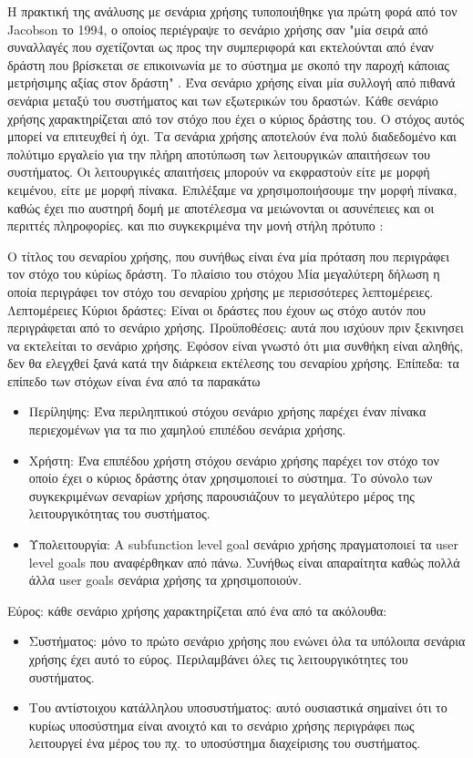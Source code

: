Η πρακτική της ανάλυσης με σενάρια χρήσης τυποποιήθηκε για πρώτη φορά από τον Jacobson το 1994, ο οποίος περιέγραψε το σενάριο χρήσης σαν "μία σειρά από συναλλαγές που σχετίζονται ως προς την συμπεριφορά και εκτελούνται από έναν δράστη που βρίσκεται σε επικοινωνία με το σύστημα με σκοπό την παροχή κάποιας μετρήσιμης αξίας στον δράστη" \cite{Jacobson} . Ένα σενάριο χρήσης είναι μία συλλογή από πιθανά σενάρια μεταξύ του συστήματος και των εξωτερικών του δραστών. Κάθε σενάριο χρήσης χαρακτηρίζεται από τον στόχο που έχει ο κύριος δράστης του. Ο στόχος αυτός μπορεί να επιτευχθεί ή όχι. Τα σενάρια χρήσης αποτελούν ένα πολύ διαδεδομένο και πολύτιμο εργαλείο για την πλήρη αποτύπωση των λειτουργικών απαιτήσεων του συστήματος. Οι λειτουργικές απαιτήσεις μπορούν να εκφραστούν είτε με μορφή κειμένου, είτε με μορφή πίνακα. Επιλέξαμε να χρησιμοποιήσουμε την μορφή πίνακα, καθώς έχει πιο αυστηρή δομή με αποτέλεσμα να μειώνονται οι ασυνέπειες και οι περιττές πληροφορίες. \cite{Cockburn2000} και πιο συγκεκριμένα την μονή στήλη πρότυπο \cite{Cockburn2000} :
 
 Ο τίτλος του σεναρίου χρήσης, που συνήθως είναι ένα μία πρόταση που περιγράφει τον στόχο του κύρίως δράστη.
 Το πλαίσιο του στόχου
 Μία μεγαλύτερη δήλωση η οποία περιγράφει τον στόχο του σεναρίου χρήσης με περισσότερες λεπτομέρειες.
 Λεπτομέρειες
 Κύριοι δράστες: Είναι οι δράστες που έχουν ως στόχο αυτόν που περιγράφεται από το σενάριο χρήσης.
 Προϋποθέσεις: αυτά που ισχύουν πριν ξεκινησει να εκτελείται το σενάριο χρήσης. Εφόσον είναι γνωστό ότι μια συνθήκη είναι αληθής, δεν θα ελεγχθεί ξανά κατά την διάρκεια εκτέλεσης του σεναρίου χρήσης. 
 Επίπεδα: τα επίπεδο των στόχων είναι ένα από τα παρακάτω 
 \begin{itemize}
\item  Περίληψης:  Ένα περιληπτικού στόχου σενάριο χρήσης παρέχει έναν πίνακα περιεχομένων για τα πιο χαμηλού επιπέδου σενάρια χρήσης.
\item Χρήστη: Ένα επιπέδου χρήστη στόχου σενάριο χρήσης παρέχει τον στόχο τον οποίο έχει ο κύριος δράστης όταν χρησιμοποιεί το σύστημα. Το σύνολο των συγκεκριμένων σεναρίων χρήσης παρουσιάζουν το μεγαλύτερο μέρος της λειτουργικότητας του συστήματος. 
\item  Υπολειτουργία: A subfunction level goal σενάριο χρήσης πραγματοποιεί τα user level goals που αναφέρθηκαν από πάνω. Συνήθως είναι απαραίτητα καθώς πολλά άλλα user goals σενάρια χρήσης τα χρησιμοποιούν.
 \end{itemize}
 
 Εύρος: κάθε σενάριο χρήσης χαρακτηρίζεται από ένα από τα ακόλουθα:
 \begin{itemize}
 \item  Συστήματος: μόνο το πρώτο σενάριο χρήσης που ενώνει όλα τα υπόλοιπα σενάρια χρήσης έχει αυτό το εύρος. Περιλαμβάνει όλες τις λειτουργικότητες του συστήματος.
 \item Του αντίστοιχου κατάλληλου υποσυστήματος: αυτό ουσιαστικά σημαίνει ότι το κυρίως υποσύστημα είναι ανοιχτό και το σενάριο χρήσης περιγράφει πως λειτουργεί ένα μέρος του πχ. το υποσύστημα διαχείρισης του συστήματος.
 \end{itemize}
 
